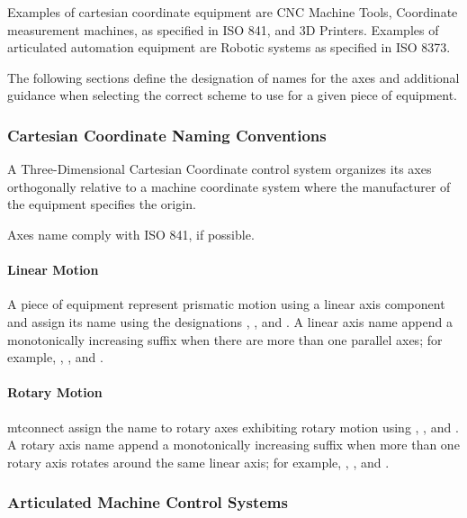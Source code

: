 Examples of cartesian coordinate equipment are CNC Machine Tools, Coordinate measurement machines, as specified in ISO 841, and 3D Printers. Examples of articulated automation equipment are Robotic systems as specified in ISO 8373.

The following sections define the designation of names for the axes and additional guidance when selecting the correct scheme to use for a given piece of equipment.

\subsubsection{Cartesian Coordinate Naming Conventions}
\label{sec:Cartesian Coordinate Naming Conventions}

A Three-Dimensional Cartesian Coordinate control system organizes its axes orthogonally relative to a machine coordinate system where the manufacturer of the equipment specifies the origin. 

Axes \gls{name} \SHOULD comply with ISO 841, if possible.

\newpage

\paragraph{Linear Motion}\mbox{}
\label{sec:Linear Motion}

A piece of equipment \MUST represent prismatic motion using a \gls{linear} axis \gls{component} and assign its \gls{name} using the designations , , and . A \gls{linear} axis \gls{name} \MUST append a monotonically increasing suffix when there are more than one parallel axes; for example, , , and . 

\paragraph{Rotary Motion}\mbox{}
\label{sec:Rotary Motion}

\gls{mtconnect} \MUST assign the \gls{name} to \gls{rotary} axes exhibiting rotary motion using , , and . A \gls{rotary} axis \gls{name} \MUST append a monotonically increasing suffix when more than one \gls{rotary} axis rotates around the same \gls{linear} axis; for example, , , and . 

\subsubsection{Articulated Machine Control Systems}
\label{sec:Articulated Machine Control Systems}

